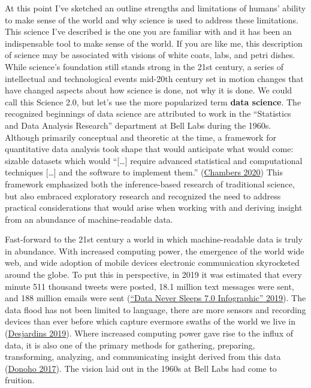 \documentclass[
  letterpaper,
  DIV=11,
  numbers=noendperiod]{scrreport}
\theoremstyle{definition}
\theoremstyle{remark}
\begin{document}
At this point I've sketched an outline strengths and limitations of
humans' ability to make sense of the world and why science is used to
address these limitations. This science I've described is the one you
are familiar with and it has been an indispensable tool to make sense of
the world. If you are like me, this description of science may be
associated with visions of white coats, labs, and petri dishes. While
science's foundation still stands strong in the 21st century, a series
of intellectual and technological events mid-20th century set in motion
changes that have changed aspects about how science is done, not why it
is done. We could call this Science 2.0, but let's use the more
popularized term \textbf{data science}. The
recognized beginnings of data science are attributed to work in the
``Statistics and Data Analysis Research'' department at Bell Labs during
the 1960s. Although primarily conceptual and theoretic at the time, a
framework for quantitative data analysis took shape that would
anticipate what would come: sizable datasets which would ``{[}\ldots{]}
require advanced statistical and computational techniques {[}\ldots{]}
and the software to implement them.''
(\protect\hyperlink{ref-Chambers2020}{Chambers 2020}) This framework
emphasized both the inference-based research of traditional science, but
also embraced exploratory research and recognized the need to address
practical considerations that would arise when working with and deriving
insight from an abundance of machine-readable data.

Fast-forward to the 21st century a world in which machine-readable data
is truly in abundance. With increased computing power, the emergence of
the world wide web, and wide adoption of mobile devices electronic
communication skyrocketed around the globe. To put this in perspective,
in 2019 it was estimated that every minute 511 thousand tweets were
posted, 18.1 million text messages were sent, and 188 million emails
were sent (\protect\hyperlink{ref-DataNeverSleeps08-2021}{{``Data Never
Sleeps 7.0 Infographic''} 2019}). The data flood has not been limited to
language, there are more sensors and recording devices than ever before
which capture evermore swaths of the world we live in
(\protect\hyperlink{ref-Desjardins2019}{Desjardins 2019}). Where
increased computing power gave rise to the influx of data, it is also
one of the primary methods for gathering, preparing, transforming,
analyzing, and communicating insight derived from this data
(\protect\hyperlink{ref-Donoho2017}{Donoho 2017}). The vision laid out
in the 1960s at Bell Labs had come to fruition.
\end{document}
